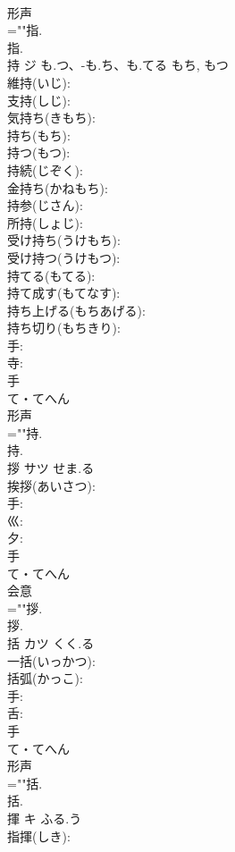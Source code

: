 \documentclass[8pt]{extreport}
\begin{document}
\begin{CJK}{UTF8}{min}
\\	形声 
\\	=""指.
\\	指.
\\	持	ジ	も.つ、-も.ち、も.てる	もち, もつ	
\\	維持(いじ): 
\\	支持(しじ): 
\\	気持ち(きもち): 
\\	持ち(もち): 
\\	持つ(もつ): 
\\	持続(じぞく): 
\\	金持ち(かねもち): 
\\	持参(じさん): 
\\	所持(しょじ): 
\\	受け持ち(うけもち): 
\\	受け持つ(うけもつ): 
\\	持てる(もてる): 
\\	持て成す(もてなす): 
\\	持ち上げる(もちあげる): 
\\	持ち切り(もちきり): 
\\	手: 
\\	寺: 
\\	手	
\\	て・てへん	
\\	形声 
\\	=""持.
\\	持.
\\	拶	サツ	せま.る		
\\	挨拶(あいさつ): 
\\	手: 
\\	巛: 
\\	夕: 
\\	手	
\\	て・てへん	
\\	会意 
\\	=""拶.
\\	拶.
\\	括	カツ	くく.る		
\\	一括(いっかつ): 
\\	括弧(かっこ): 
\\	手: 
\\	舌: 
\\	手	
\\	て・てへん	
\\	形声 
\\	=""括.
\\	括.
\\	揮	キ	ふる.う		
\\	指揮(しき): 

\end{CJK}
\end{document}
